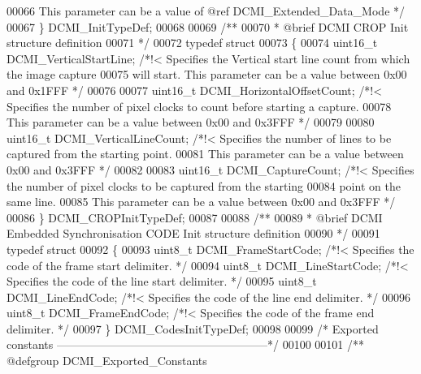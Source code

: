 \begin{DoxyCode}
00066 \textcolor{comment}{                                       This parameter can be a value of @ref DCMI\_Extended\_Data\_Mode
       */}
00067 \} DCMI\_InitTypeDef;
00068 
00069 \textcolor{comment}{/** }
00070 \textcolor{comment}{  * @brief   DCMI CROP Init structure definition  }
00071 \textcolor{comment}{  */}
00072 \textcolor{keyword}{typedef} \textcolor{keyword}{struct}
00073 \{
00074   uint16\_t DCMI_VerticalStartLine;      \textcolor{comment}{/*!< Specifies the Vertical start line count from which the
       image capture}
00075 \textcolor{comment}{                                             will start. This parameter can be a value between 0x00
       and 0x1FFF */}
00076 
00077   uint16\_t DCMI_HorizontalOffsetCount;  \textcolor{comment}{/*!< Specifies the number of pixel clocks to count before
       starting a capture.}
00078 \textcolor{comment}{                                             This parameter can be a value between 0x00 and 0x3FFF */}
00079 
00080   uint16\_t DCMI_VerticalLineCount;      \textcolor{comment}{/*!< Specifies the number of lines to be captured from the
       starting point.}
00081 \textcolor{comment}{                                             This parameter can be a value between 0x00 and 0x3FFF */}
00082 
00083   uint16\_t DCMI_CaptureCount;           \textcolor{comment}{/*!< Specifies the number of pixel clocks to be captured from
       the starting}
00084 \textcolor{comment}{                                             point on the same line.}
00085 \textcolor{comment}{                                             This parameter can be a value between 0x00 and 0x3FFF */}
00086 \} DCMI\_CROPInitTypeDef;
00087 
00088 \textcolor{comment}{/** }
00089 \textcolor{comment}{  * @brief   DCMI Embedded Synchronisation CODE Init structure definition  }
00090 \textcolor{comment}{  */}
00091 \textcolor{keyword}{typedef} \textcolor{keyword}{struct}
00092 \{
00093   uint8\_t DCMI_FrameStartCode; \textcolor{comment}{/*!< Specifies the code of the frame start delimiter. */}
00094   uint8\_t DCMI_LineStartCode;  \textcolor{comment}{/*!< Specifies the code of the line start delimiter. */}
00095   uint8\_t DCMI_LineEndCode;    \textcolor{comment}{/*!< Specifies the code of the line end delimiter. */}
00096   uint8\_t DCMI_FrameEndCode;   \textcolor{comment}{/*!< Specifies the code of the frame end delimiter. */}
00097 \} DCMI\_CodesInitTypeDef;
00098 
00099 \textcolor{comment}{/* Exported constants --------------------------------------------------------*/}
00100 
00101 \textcolor{comment}{/** @defgroup DCMI\_Exported\_Constants}

\end{DoxyCode}
